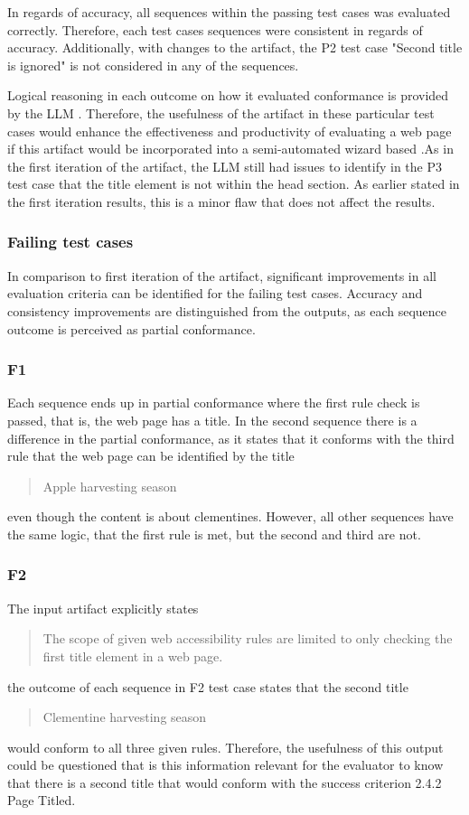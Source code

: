 In regards of accuracy, all sequences within the passing test cases was evaluated correctly. Therefore, each test cases sequences were consistent in regards of accuracy. Additionally‚ with changes to the artifact, the P2 test case "Second title is ignored" is not considered in any of the sequences. 

Logical reasoning in each outcome on how it evaluated conformance is provided by the LLM . Therefore, the usefulness of the artifact in these particular test cases would enhance the effectiveness and productivity of evaluating a web page if this artifact would be incorporated into a semi-automated wizard based .As in the first iteration of the artifact, the LLM still had issues to identify in the P3 test case that the title element is not within the head section. As earlier stated in the first iteration results, this is a minor flaw that does not affect the results.

\subsubsection{Failing test cases}

In comparison to first iteration of the artifact, significant improvements in all evaluation criteria can be identified for the failing test cases. Accuracy and consistency improvements are distinguished from the outputs, as each sequence outcome is perceived as partial conformance. 

\subsubsection{F1}

Each sequence ends up in partial conformance where the first rule check is passed, that is, the web page has a title. In the second sequence there is a difference in the partial conformance, as it states that it conforms with the third rule that the web page can be identified by the title \blockquote{Apple harvesting season} even though the content is about clementines. However, all other sequences have the same logic, that the first rule is met, but the second and third are not.

\subsubsection{F2}

The input artifact explicitly states \blockquote{The scope of given web accessibility rules are limited to only checking the first title element in a web page.} the outcome of each sequence in F2 test case states that the second title \blockquote{Clementine harvesting season} would conform to all three given rules. Therefore, the usefulness of this output could be questioned that is this information relevant for the evaluator to know that there is a second title that would conform with the success criterion 2.4.2 Page Titled.

